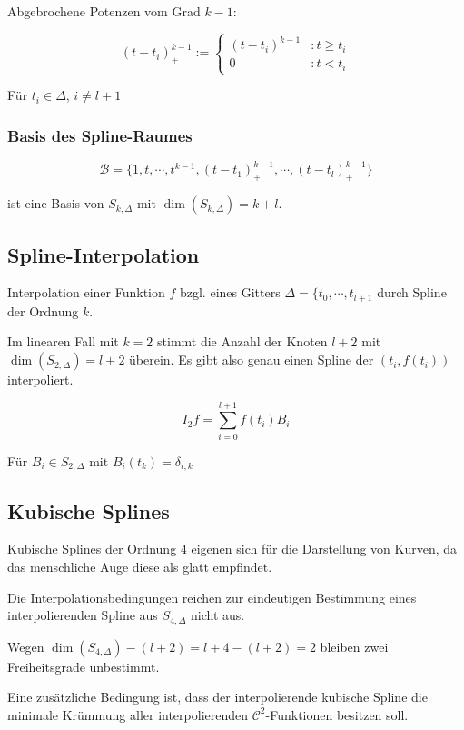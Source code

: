 Abgebrochene Potenzen vom Grad $k-1$:

$$(t-t_i)_+^{k-1} := \begin{cases}(t-t_i)^{k-1} &: t \geq t_i \\ 0 &: t < t_i\end{cases}$$

Für $t_i \in \Delta$, $i \neq l+1$

\subsubsection*{Basis des Spline-Raumes}

$$\mathcal{B} = \{1,t,\cdots,t^{k-1},(t-t_1)_+^{k-1},\cdots,(t-t_l)_+^{k-1}\}$$

ist eine Basis von $S_{k,\Delta}$ mit $\dim(S_{k,\Delta}) = k + l$.

\subsection*{Spline-Interpolation}

Interpolation einer Funktion $f$ bzgl. eines Gitters $\Delta = \{t_0,\cdots,t_{l+1}$ durch Spline der Ordnung $k$.

\vspace{2mm}

Im linearen Fall mit $k=2$ stimmt die Anzahl der Knoten $l+2$ mit $\dim(S_{2,\Delta})=l+2$ überein. Es gibt also genau einen Spline der $(t_i,f(t_i))$ interpoliert.

$$I_2 f = \sum_{i=0}^{l+1} f(t_i) B_i$$

Für $B_i \in S_{2,\Delta}$ mit $B_i(t_k) = \delta_{i,k}$

\subsection*{Kubische Splines}

Kubische Splines der Ordnung 4 eigenen sich für die Darstellung von Kurven, da das menschliche Auge diese als glatt empfindet.

\vspace{2mm}

Die Interpolationsbedingungen reichen zur eindeutigen Bestimmung eines interpolierenden Spline aus $S_{4,\Delta}$ nicht aus.

Wegen $\dim(S_{4,\Delta}) - (l+2) = l+4-(l+2) = 2$ bleiben zwei Freiheitsgrade unbestimmt.

Eine zusätzliche Bedingung ist, dass der interpolierende kubische Spline die minimale Krümmung aller interpolierenden $\mathcal{C}^2$-Funktionen besitzen soll.

